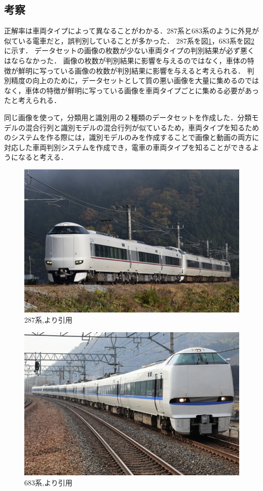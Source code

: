 \subsection{考察}
正解率は車両タイプによって異なることがわかる．287系と683系のように外見が似ている電車だと，誤判別していることが多かった．
287系を図\ref{fig:287}，683系を図\ref{fig:683}に示す．
データセットの画像の枚数が少ない車両タイプの判別結果が必ず悪くはならなかった．
画像の枚数が判別結果に影響を与えるのではなく，車体の特徴が鮮明に写っている画像の枚数が判別結果に影響を与えると考えられる．
判別精度の向上のために，データセットとして質の悪い画像を大量に集めるのではなく，車体の特徴が鮮明に写っている画像を車両タイプごとに集める必要があったと考えられる．

同じ画像を使って，分類用と識別用の２種類のデータセットを作成した．分類モデルの混合行列と識別モデルの混合行列が似ているため，車両タイプを知るためのシステムを作る際には，識別モデルのみを作成することで画像と動画の両方に対応した車両判別システムを作成でき，電車の車両タイプを知ることができるようになると考える．

\begin{figure}
	\centering
	\includegraphics[width=0.7\linewidth]{chap4/fig/287}
	\caption{287系,\cite{ac}より引用}
	\label{fig:287}
\end{figure}

\begin{figure}
	\centering
	\includegraphics[width=0.7\linewidth]{chap4/fig/683}
	\caption{683系,\cite{ac}より引用}
	\label{fig:683}
\end{figure}

